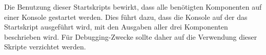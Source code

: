 	Die Benutzung dieser Startskripts bewirkt, dass alle benötigten Komponenten auf einer Konsole gestartet werden. Dies führt dazu, dass die Konsole 
	auf der das Startskript ausgeführt wird, mit den Ausgaben aller drei Komponenten beschrieben wird. Für Debugging-Zwecke sollte daher auf die Verwendung dieser 
	Skripte verzichtet werden.
